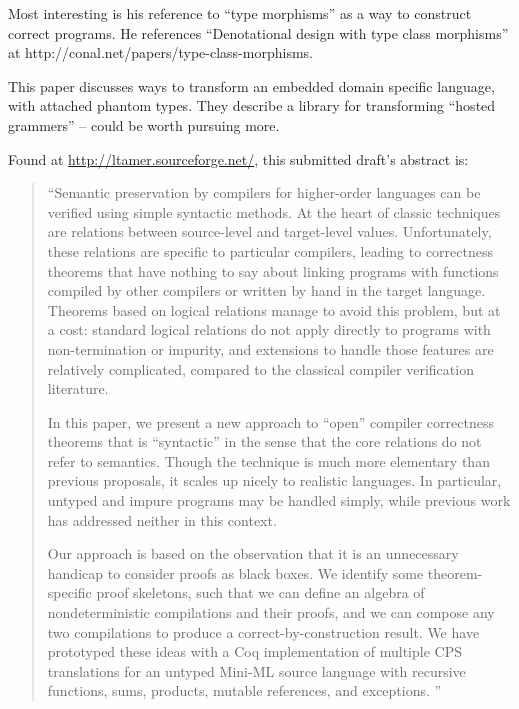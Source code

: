 \documentclass[11pt]{article}
\begin{document}

Most interesting is his reference to ``type morphisms'' as a way to
construct correct programs. He references ``Denotational design with
type class morphisms'' at
http://conal.net/papers/type-class-morphisms.


This paper discusses ways to transform an embedded domain specific
language, with attached phantom types. They describe a library for
transforming ``hosted grammers'' -- could be worth pursuing more.


Found at \url{http://ltamer.sourceforge.net/}, this submitted draft's abstract is:

\begin{quote}
``Semantic preservation by compilers for higher-order languages can be
  veriﬁed using simple syntactic methods. At the heart of classic
  techniques are relations between source-level and target-level
  values. Unfortunately, these relations are speciﬁc to particular
  compilers, leading to correctness theorems that have nothing to say
  about linking programs with functions compiled by other compilers or
  written by hand in the target language. Theorems based on logical
  relations manage to avoid this problem, but at a cost: standard
  logical relations do not apply directly to programs with
  non-termination or impurity, and extensions to handle those features
  are relatively complicated, compared to the classical compiler
  veriﬁcation literature.

  In this paper, we present a new approach to ``open'' compiler
  correctness theorems that is ``syntactic'' in the sense that the
  core relations do not refer to semantics. Though the technique is
  much more elementary than previous proposals, it scales up nicely
  to realistic languages. In particular, untyped and impure programs
  may be handled simply, while previous work has addressed neither
  in this context.
  
  Our approach is based on the observation that it is an unnecessary
  handicap to consider proofs as black boxes. We identify some
  theorem-speciﬁc proof skeletons, such that we can deﬁne an algebra
  of nondeterministic compilations and their proofs, and we can
  compose any two compilations to produce a correct-by-construction
  result. We have prototyped these ideas with a Coq implementation
  of multiple CPS translations for an untyped Mini-ML source
  language with recursive functions, sums, products, mutable
  references, and exceptions. ''
\end{quote}
\end{document}
